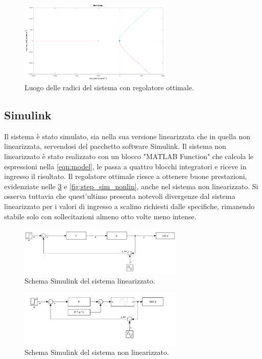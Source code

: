 \documentclass[a4paper]{article}
\begin{document}
\begin{figure}[h!]
    \centering
    \includegraphics[width=0.65\textwidth]{rlocus}
    \caption{Luogo delle radici del sistema con regolatore ottimale.}
    \label{fig:rlocus}
\end{figure}

\subsection{Simulink}
Il sistema è stato simulato, sia nella sua versione linearizzata che in quella non linearizzata, servendosi del pacchetto software Simulink. 
Il sistema non linearizzato è stato realizzato con un blocco "MATLAB Function" che calcola le espressioni nella \cref{eqn:model}, le passa a quattro blocchi integratori e riceve in ingresso il risultato.
Il regolatore ottimale riesce a ottenere buone prestazioni, evidenziate nelle \cref{fig:sim_nonlin} e \cref{fig:step_sim_nonlin}, anche nel sistema non linearizzato.
Si osserva tuttavia che quest'ultimo presenta notevoli divergenze dal sistema linearizzato per i valori di ingresso a scalino richiesti dalle specifiche, rimanendo stabile solo con sollecitazioni almeno otto volte meno intense.
\begin{figure}[h!]
    \centering
    \includegraphics[width=0.7\textwidth]{Simul1C.pdf}
    \caption{Schema Simulink del sistema linearizzato.}
    \label{fig:sim_lin}
\end{figure}
\begin{figure}[h!]
    \centering
    \includegraphics[width=0.7\textwidth]{NonLin1C.pdf}
    \caption{Schema Simulink del sistema non linearizzato. }
    \label{fig:sim_nonlin}
\end{figure}
\end{document}
